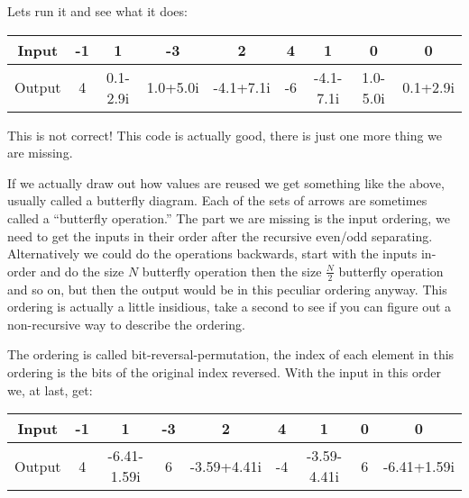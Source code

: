\documentclass[12pt]{article}
\begin{document}
Lets run it and see what it does:

\begin{center}
  \begin{tabular}{ |c|c|c|c|c|c|c|c|c| }
    \hline
    Input  & -1 & 1        & -3       & 2         & 4  & 1         & 0        & 0        \\
    \hline
    Output & 4  & 0.1-2.9i & 1.0+5.0i & -4.1+7.1i & -6 & -4.1-7.1i & 1.0-5.0i & 0.1+2.9i \\
    \hline
  \end{tabular}
\end{center}

This is not correct! This code is actually good, there is just one more thing we are missing.

\pagebreak


If we actually draw out how values are reused we get something like the above, usually called a butterfly diagram. Each of the sets of arrows are sometimes called a ``butterfly operation.'' The part we are missing is the input ordering, we need to get the inputs in their order after the recursive even/odd separating. Alternatively we could do the operations backwards, start with the inputs in-order and do the size $N$ butterfly operation then the size $\frac{N}{2}$ butterfly operation and so on, but then the output would be in this peculiar ordering anyway. This ordering is actually a little insidious, take a second to see if you can figure out a non-recursive way to describe the ordering.

The ordering is called bit-reversal-permutation, the index of each element in this ordering is the bits of the original index reversed. With the input in this order we, at last, get:
\begin{center}
  \begin{tabular}{ |c|c|c|c|c|c|c|c|c| }
    \hline
    Input  & -1 & 1           & -3 & 2           & 4  & 1           & 0 & 0           \\
    \hline
    Output & 4  & -6.41-1.59i & 6  & -3.59+4.41i & -4 & -3.59-4.41i & 6 & -6.41+1.59i \\
    \hline
  \end{tabular}
\end{center}
\end{document}
